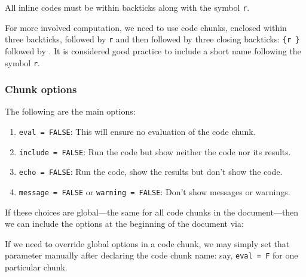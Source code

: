 \documentclass[11pt,]{article}
\newenvironment{Shaded}{\begin{snugshade}}{\end{snugshade}}
\newcommand{\KeywordTok}[1]{\textcolor[rgb]{0.13,0.29,0.53}{\textbf{#1}}}
\newcommand{\DataTypeTok}[1]{\textcolor[rgb]{0.13,0.29,0.53}{#1}}
\newcommand{\OperatorTok}[1]{\textcolor[rgb]{0.81,0.36,0.00}{\textbf{#1}}}
\newcommand{\NormalTok}[1]{#1}
\providecommand{\tightlist}{%
  \setlength{\itemsep}{0pt}\setlength{\parskip}{0pt}}
\begin{document}
All inline codes must be within backticks along with the symbol
\texttt{r}.

For more involved computation, we need to use code chunks, enclosed
within three backticks, followed by \texttt{r} and then followed by
three closing backticks:
\texttt{\textasciigrave{}\textasciigrave{}\textasciigrave{}\{r\ \}}
followed by
\texttt{\textasciigrave{}\textasciigrave{}\textasciigrave{}}. It is
considered good practice to include a short name following the symbol
\texttt{r}.

\subsubsection{Chunk options}\label{chunk-options}

The following are the main options:

\begin{enumerate}
\def\labelenumi{\arabic{enumi}.}
\tightlist
\item
  \texttt{eval\ =\ FALSE}: This will ensure no evaluation of the code
  chunk.
\item
  \texttt{include\ =\ FALSE}: Run the code but show neither the code nor
  its results.
\item
  \texttt{echo\ =\ FALSE}: Run the code, show the results but don't show
  the code.
\item
  \texttt{message\ =\ FALSE} or \texttt{warning\ =\ FALSE}: Don't show
  messages or warnings.
\end{enumerate}

If these choices are global---the same for all code chunks in the
document---then we can include the options at the beginning of the
document via:

\begin{Shaded}
\end{Shaded}

If we need to override global options in a code chunk, we may simply set
that parameter manually after declaring the code chunk name: say,
\texttt{eval\ =\ F} for one particular chunk.
\end{document}

